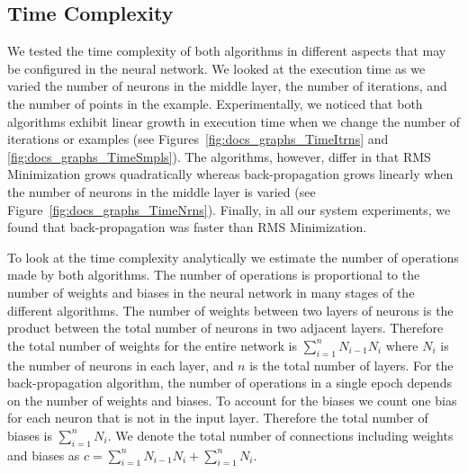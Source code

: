\documentclass[11pt]{article}
\begin{document}
\subsection{Time Complexity} %
\label{sub:time_complexity}

We tested the time complexity of both algorithms in different aspects that may be configured in the neural network. We looked at the
execution time as we varied the number of neurons in the middle layer, the number of iterations, and the number of points in the
example. Experimentally, we noticed that both algorithms exhibit linear growth in execution time when we change the number of iterations
or examples (see Figures~\ref{fig:docs_graphs_TimeItrns} and \ref{fig:docs_graphs_TimeSmpls}). The algorithms, however, differ in that
RMS Minimization grows quadratically whereas back-propagation grows linearly when the number of neurons in the middle layer is varied
(see Figure~\ref{fig:docs_graphs_TimeNrns}). Finally, in all our system experiments, we found that back-propagation was faster than RMS
Minimization.

To look at the time complexity analytically we estimate the number of operations made by both algorithms. The number of operations is
proportional to the number of weights and biases in the neural network in many stages of the different algorithms. The number of weights
between two layers of neurons is the product between the total number of neurons in two adjacent layers. Therefore the total number of
weights for the entire network is $\sum_{i=1}^{n}N_{i-1}N_{i}$ where $N_{i}$ is the number of neurons in each layer, and $n$ is the
total number of layers. For the back-propagation algorithm, the number of operations in a single epoch depends on the number of weights
and biases. To account for the biases we count one bias for each neuron that is not in the input layer. Therefore the total number of
biases is $\sum_{i=1}^{n}N_{i}$. We denote the total number of connections including weights and biases as
$c=\sum_{i=1}^{n}N_{i-1}N_{i} + \sum_{i=1}^{n}N_{i}$.
\end{document}
